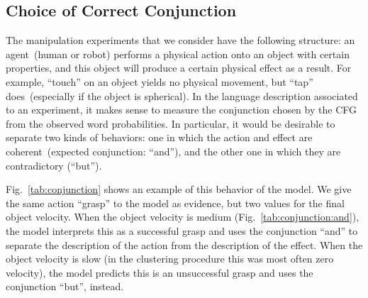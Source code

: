 \subsection{Choice of Correct Conjunction}

\newcommand{\evidenceProducingAnd}{Action=grasp, ObjVel=medium}
\newcommand{\evidenceProducingBut}{Action=grasp, ObjVel=slow}

The manipulation experiments that we consider have the following structure: an agent~(human or robot) performs a physical action onto an object with certain properties, and this object will produce a certain physical effect as a result.
For example, ``touch'' on an object yields no physical movement, but ``tap'' does~(especially if the object is spherical).
In the language description associated to an experiment, it makes sense to measure the conjunction chosen by the \acf{CFG} from the observed word probabilities.
In particular, it would be desirable to separate two kinds of behaviors: one in which the action and effect are coherent~(expected conjunction: ``and''), and the other one in which they are contradictory (``but'').

Fig.~\ref{tab:conjunction} shows an example of this behavior of the model.
We give the same action ``grasp'' to the model as evidence, but two values for the final object velocity.
When the object velocity is medium (Fig.~\ref{tab:conjunction:and}), the model interprets this as a successful grasp and uses the conjunction ``and'' to separate the description of the action from the description of the effect.
When the object velocity is slow (in the clustering procedure this was most often zero velocity), the model predicts this is an unsuccessful grasp and uses the conjunction ``but'', instead.

%



